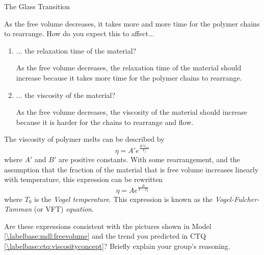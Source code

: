\begin{activity}{The Glass Transition}
\begin{ctqs}
	\question As the free volume decreases, it takes more and more time for the polymer chains to rearrange.  How do you expect this to affect... \label{\labelbase:ctq:viscosityconcept}
	
		\begin{enumerate}
			\item ... the relaxation time of the material?
			
				\begin{solution}[0.5in]{}
					As the free volume decreases, the relaxation time of the material should increase because it takes more time for the polymer chains to rearrange.
				\end{solution}
			
			\item ... the viscosity of the material?
			
				\begin{solution}[0.5in]{}
					As the free volume decreases, the viscosity of the material should increase because it is harder for the chains to rearrange and flow.
				\end{solution}
				
		\end{enumerate}
	
\end{ctqs}

\begin{infobox}

	The viscosity of polymer melts can be described by
	\begin{equation*}
		\eta = A' e^{\frac{B' V_{occ}}{V_f}}
	\end{equation*}
	where $A'$ and $B'$ are positive constants.  With some rearrangement, and the assumption that the fraction of the material that is free volume increases linearly with temperature, this expression can be rewritten
	\begin{equation*}
		\eta = A e^{\frac{B}{T-T_0}}
	\end{equation*}
	where $T_0$ is the \emph{Vogel temperature}.  This expression is known as the \emph{Vogel-Fulcher-Tamman} (or VFT) \emph{equation}.
			
\end{infobox}

\begin{ctqs}
		
	\question Are these expressions consistent with the pictures shown in Model \ref{\labelbase:mdl:freevolume} and the trend you predicted in CTQ \ref{\labelbase:ctq:viscosityconcept}?  Briefly explain your group's reasoning.
			

\end{ctqs}
\end{activity}
